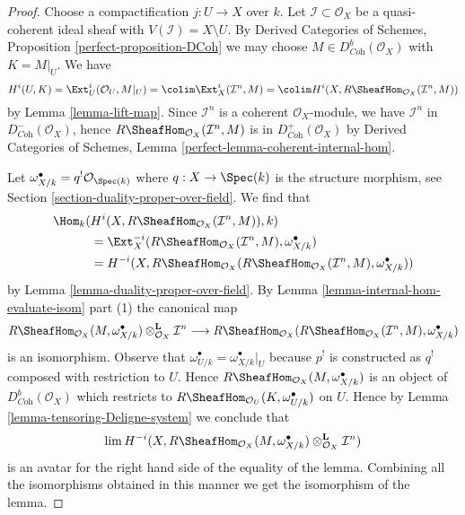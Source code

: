 \begin{proof}
Choose a compactification $j : U \to X$ over $k$. Let
$\mathcal{I} \subset \mathcal{O}_X$ be a quasi-coherent ideal
sheaf with $V(\mathcal{I}) = X \setminus U$.
By Derived Categories of Schemes, Proposition \ref{perfect-proposition-DCoh}
we may choose $M \in D^b_{\textit{Coh}}(\mathcal{O}_X)$
with $K = M|_U$. We have
$$
H^i(U, K) =
\Ext^i_U(\mathcal{O}_U, M|_U) =
\colim \Ext^i_X(\mathcal{I}^n, M) =
\colim H^i(X, R\SheafHom_{\mathcal{O}_X}(\mathcal{I}^n, M))
$$
by Lemma \ref{lemma-lift-map}.
Since $\mathcal{I}^n$ is a coherent $\mathcal{O}_X$-module,
we have $\mathcal{I}^n$ in $D^-_{\textit{Coh}}(\mathcal{O}_X)$,
hence $R\SheafHom_{\mathcal{O}_X}(\mathcal{I}^n, M)$ is in
$D^+_{\textit{Coh}}(\mathcal{O}_X)$ by
Derived Categories of Schemes, Lemma
\ref{perfect-lemma-coherent-internal-hom}.

\medskip\noindent
Let $\omega_{X/k}^\bullet = q^!\mathcal{O}_{\Spec(k)}$ where
$q : X \to \Spec(k)$ is the structure morphism, see
Section \ref{section-duality-proper-over-field}. We find that
\begin{align*}
\Hom_k(
&
H^i(X, R\SheafHom_{\mathcal{O}_X}(\mathcal{I}^n, M)), k) \\
& =
\Ext^{-i}_X(R\SheafHom_{\mathcal{O}_X}(\mathcal{I}^n, M),
\omega_{X/k}^\bullet) \\
& =
H^{-i}(X, R\SheafHom_{\mathcal{O}_X}(R\SheafHom_{\mathcal{O}_X}(
\mathcal{I}^n, M), \omega_{X/k}^\bullet))
\end{align*}
by Lemma \ref{lemma-duality-proper-over-field}. By
Lemma \ref{lemma-internal-hom-evaluate-isom} part (1) the canonical map
$$
R\SheafHom_{\mathcal{O}_X}(M, \omega_{X/k}^\bullet)
\otimes_{\mathcal{O}_X}^\mathbf{L} \mathcal{I}^n
\longrightarrow
R\SheafHom_{\mathcal{O}_X}(R\SheafHom_{\mathcal{O}_X}(
\mathcal{I}^n, M), \omega_{X/k}^\bullet)
$$
is an isomorphism. Observe that
$\omega^\bullet_{U/k} = \omega^\bullet_{X/k}|_U$
because $p^!$ is constructed as $q^!$ composed with restriction to $U$.
Hence $R\SheafHom_{\mathcal{O}_X}(M, \omega_{X/k}^\bullet)$ is
an object of $D^b_{\textit{Coh}}(\mathcal{O}_X)$ which restricts
to $R\SheafHom_{\mathcal{O}_U}(K, \omega_{U/k}^\bullet)$ on $U$.
Hence by Lemma \ref{lemma-tensoring-Deligne-system} we conclude that
$$
\lim H^{-i}(X, R\SheafHom_{\mathcal{O}_X}(M, \omega_{X/k}^\bullet)
\otimes_{\mathcal{O}_X}^\mathbf{L} \mathcal{I}^n)
$$
is an avatar for the right hand side of the equality of the lemma.
Combining all the isomorphisms obtained in this manner we get
the isomorphism of the lemma.
\end{proof}

